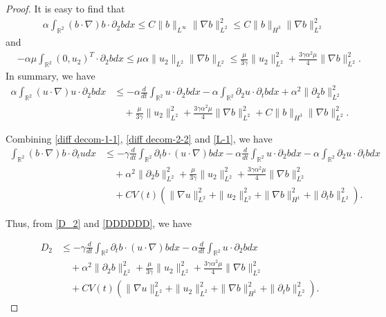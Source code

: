 \documentclass[10pt,a4paper]{amsart}
\def\R{\mathbb R}
\begin{document}
\begin{proof}
It is easy to find that
\begin{align*}
&\alpha\int_{\R^2}(b\cdot\nabla) b\cdot\partial_2 bdx\leq C\|b\|_{L^{\infty}}\|\nabla b\|_{L^{2}}^2\leq C\| b\|_{H^{3}}\|\nabla b\|_{L^{2}}^2
\end{align*}
and
\begin{align*}
&-\alpha\mu\int_{\R^2}(0,u_2)^{T}\cdot\partial_2 bdx\leq\mu\alpha\|u_2\|_{L^{2}}\|\nabla b\|_{L^{2}}\leq \frac{\mu}{3\gamma}\| u_2\|_{L^{2}}^{2}+\frac{3\gamma\alpha^2\mu}{4}\|\nabla b\|_{L^{2}}^2.
\end{align*}
In summary, we have
 \begin{align}\label{L-1}
\alpha\int_{\R^2}(u\cdot \nabla) u\cdot\partial_2 bdx
&\leq-\alpha\frac{d}{dt}\int_{\R^2}u\cdot\partial_2 bdx-\alpha\int_{\R^2}\partial_2u\cdot\partial_t bdx+\alpha^2\|\partial_2b\|_{L^2}^2\nonumber\\
&\quad+\frac{\mu}{3\gamma}\| u_2\|_{L^{2}}^{2}+\frac{3\gamma\alpha^2\mu}{4}\|\nabla b\|_{L^{2}}^2+ C\|b\|_{H^3}\|\nabla b\|_{L^2}^2.
\end{align}

Combining \eqref{diff decom-1-1},  \eqref{diff decom-2-2} and \eqref{L-1}, we have
\begin{align}\label{DDDDDD}
\int_{\R^2}(b\cdot \nabla)b\cdot \partial_tudx&\leq-\gamma\frac{d}{dt}\int_{\R^2}\partial_{t}b\cdot (u\cdot\nabla) bdx-\alpha\frac{d}{dt}\int_{\R^2}u\cdot\partial_2 bdx-\alpha\int_{\R^2}\partial_2u\cdot\partial_t bdx\nonumber\\
&\quad+\alpha^2\|\partial_2b\|_{L^2}^2+\frac{\mu}{3\gamma}\| u_2\|_{L^{2}}^{2}+\frac{3\gamma\alpha^2\mu}{4}\|\nabla b\|_{L^{2}}^2\nonumber\\
&\quad+CV(t)\left(\|\nabla u\|_{L^{2}}^2+\|u_2\|_{L^2}^2+\|\nabla b\|_{H^1}^2+\|\partial_tb\|_{L^{2}}^2\right).
\end{align}

 Thus, from \eqref{D_2} and \eqref{DDDDDD}, we have

\begin{align}\label{DDDDDD1}
D_2&\leq-\gamma\frac{d}{dt}\int_{\R^2}\partial_{t}b\cdot (u\cdot\nabla) bdx-\alpha\frac{d}{dt}\int_{\R^2}u\cdot\partial_2 bdx\nonumber\\
&\quad+\alpha^2\|\partial_2b\|_{L^2}^2+\frac{\mu}{3\gamma}\| u_2\|_{L^{2}}^{2}+\frac{3\gamma\alpha^2\mu}{4}\|\nabla b\|_{L^{2}}^2\nonumber\\
&\quad+CV(t)\left(\|\nabla u\|_{L^{2}}^2+\|u_2\|_{L^2}^2+\|\nabla b\|_{H^1}^2+\|\partial_tb\|_{L^{2}}^2\right).
\end{align}



\end{proof}
\end{document}
